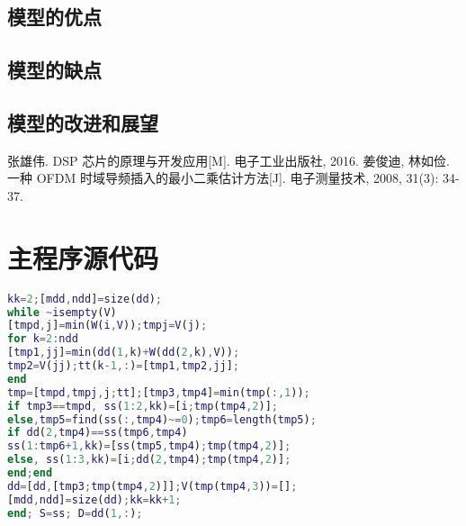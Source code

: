 \documentclass[a4paper,10pt]{my_paper}
\numberwithin{equation}{section}
\begin{document}
\subsection{模型的优点}

\subsection{模型的缺点}

\subsection{模型的改进和展望}


\begin{thebibliography}{10}
张雄伟. DSP 芯片的原理与开发应用[M]. 电子工业出版社, 2016.
姜俊迪, 林如俭. 一种 OFDM 时域导频插入的最小二乘估计方法[J]. 电子测量技术, 2008, 31(3): 34-37.
\end{thebibliography}

\newpage

\appendix

\section{主程序源代码}

\begin{lstlisting}[language=Matlab]%设置不同语言即可。
kk=2;[mdd,ndd]=size(dd);
while ~isempty(V)
[tmpd,j]=min(W(i,V));tmpj=V(j);
for k=2:ndd
[tmp1,jj]=min(dd(1,k)+W(dd(2,k),V));
tmp2=V(jj);tt(k-1,:)=[tmp1,tmp2,jj];
end
tmp=[tmpd,tmpj,j;tt];[tmp3,tmp4]=min(tmp(:,1));
if tmp3==tmpd, ss(1:2,kk)=[i;tmp(tmp4,2)];
else,tmp5=find(ss(:,tmp4)~=0);tmp6=length(tmp5);
if dd(2,tmp4)==ss(tmp6,tmp4)
ss(1:tmp6+1,kk)=[ss(tmp5,tmp4);tmp(tmp4,2)];
else, ss(1:3,kk)=[i;dd(2,tmp4);tmp(tmp4,2)];
end;end
dd=[dd,[tmp3;tmp(tmp4,2)]];V(tmp(tmp4,3))=[];
[mdd,ndd]=size(dd);kk=kk+1;
end; S=ss; D=dd(1,:);
 \end{lstlisting}
\end{document}
